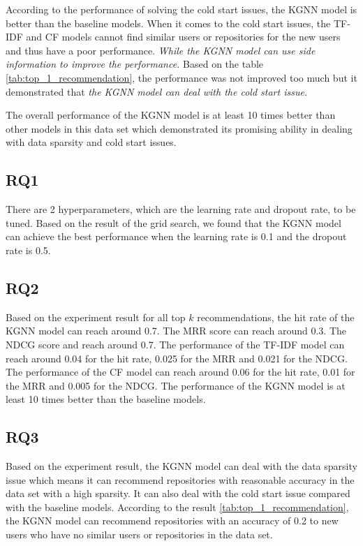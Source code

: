 \documentclass[11pt,twoside]{report}
\begin{document}
According to the performance of solving the cold start issues, the KGNN model is better than the baseline models. When it comes to the cold start issues, the TF-IDF and CF models cannot find similar users or repositories for the new users and thus have a poor performance. \textit{While the KGNN model can use side information to improve the performance.} Based on the table \ref{tab:top_1_recommendation}, the performance was not improved too much but it demonstrated that \textit{the KGNN model can deal with the cold start issue.}

The overall performance of the KGNN model is at least 10 times better than other models in this data set which demonstrated its promising ability in dealing with data sparsity and cold start issues.

\subsection{RQ1}
There are 2 hyperparameters, which are the learning rate and dropout rate, to be tuned. Based on the result of the grid search, we found that the KGNN model can achieve the best performance when the learning rate is 0.1 and the dropout rate is 0.5.

\subsection{RQ2}
Based on the experiment result for all top $k$ recommendations, the hit rate of the KGNN model can reach around 0.7. The MRR score can reach around 0.3. The NDCG score and reach around 0.7. The performance of the TF-IDF model can reach around 0.04 for the hit rate, 0.025 for the MRR and 0.021 for the NDCG. The performance of the CF model can reach around 0.06 for the hit rate, 0.01 for the MRR and 0.005 for the NDCG. The performance of the KGNN model is at least 10 times better than the baseline models.

\subsection{RQ3}
Based on the experiment result, the KGNN model can deal with the data sparsity issue which means it can recommend repositories with reasonable accuracy in the data set with a high sparsity. It can also deal with the cold start issue compared with the baseline models. According to the result \ref{tab:top_1_recommendation}, the KGNN model can recommend repositories with an accuracy of 0.2 to new users who have no similar users or repositories in the data set.
\end{document}
